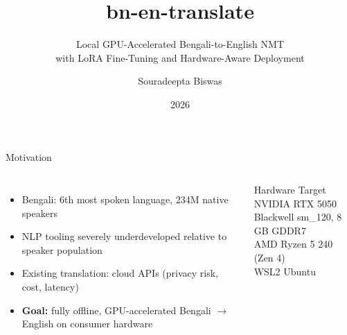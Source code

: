 \documentclass[aspectratio=169,10pt]{beamer}
\title{bn-en-translate}
\subtitle{Local GPU-Accelerated Bengali-to-English NMT\\
with LoRA Fine-Tuning and Hardware-Aware Deployment}
\author{Souradeepta Biswas}
\institute{Independent Researcher}
\date{2026}
\begin{document}
\begin{frame}
  \titlepage
\end{frame}

\begin{frame}{Motivation}
  \begin{columns}
    \begin{itemize}
      \item Bengali: 6th most spoken language, 234M native speakers
      \item NLP tooling severely underdeveloped relative to speaker population
      \item Existing translation: cloud APIs (privacy risk, cost, latency)
      \item \textbf{Goal:} fully offline, GPU-accelerated Bengali $\to$ English on consumer hardware
    \end{itemize}
    \begin{block}{Hardware Target}
      NVIDIA RTX 5050\\
      Blackwell sm\_120, 8\,GB GDDR7\\
      AMD Ryzen 5 240 (Zen 4)\\
      WSL2 Ubuntu
    \end{block}
  \end{columns}
\end{frame}
\end{document}
